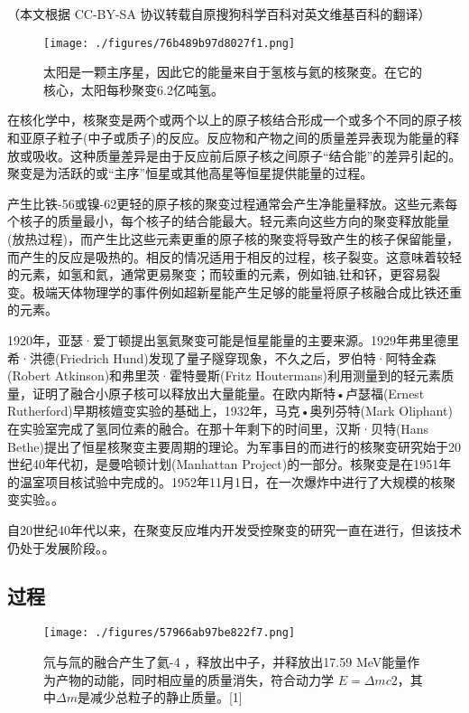 
（本文根据 CC-BY-SA 协议转载自原搜狗科学百科对英文维基百科的翻译）
\begin{figure}[ht]
\centering
\texttt{[image: ./figures/76b489b97d8027f1.png]}
\caption{太阳是一颗主序星，因此它的能量来自于氢核与氦的核聚变。在它的核心，太阳每秒聚变6.2亿吨氢。} \label{fig_HJB_13}
\end{figure}

在核化学中，核聚变是两个或两个以上的原子核结合形成一个或多个不同的原子核和亚原子粒子(中子或质子)的反应。反应物和产物之间的质量差异表现为能量的释放或吸收。这种质量差异是由于反应前后原子核之间原子“结合能”的差异引起的。聚变是为活跃的或“主序”恒星或其他高星等恒星提供能量的过程。

产生比铁-56或镍-62更轻的原子核的聚变过程通常会产生净能量释放。这些元素每个核子的质量最小，每个核子的结合能最大。轻元素向这些方向的聚变释放能量(放热过程)，而产生比这些元素更重的原子核的聚变将导致产生的核子保留能量，而产生的反应是吸热的。相反的情况适用于相反的过程，核子裂变。这意味着较轻的元素，如氢和氦，通常更易聚变；而较重的元素，例如铀,钍和钚，更容易裂变。极端天体物理学的事件例如超新星能产生足够的能量将原子核融合成比铁还重的元素。

1920年，亚瑟·爱丁顿提出氢氦聚变可能是恒星能量的主要来源。1929年弗里德里希·洪德(Friedrich Hund)发现了量子隧穿现象，不久之后，罗伯特·阿特金森(Robert Atkinson)和弗里茨·霍特曼斯(Fritz Houtermans)利用测量到的轻元素质量，证明了融合小原子核可以释放出大量能量。在欧内斯特•卢瑟福(Ernest Rutherford)早期核嬗变实验的基础上，1932年，马克•奥列芬特(Mark Oliphant)在实验室完成了氢同位素的融合。在那十年剩下的时间里，汉斯·贝特(Hans Bethe)提出了恒星核聚变主要周期的理论。为军事目的而进行的核聚变研究始于20世纪40年代初，是曼哈顿计划(Manhattan Project)的一部分。核聚变是在1951年的温室项目核试验中完成的。1952年11月1日，在一次爆炸中进行了大规模的核聚变实验。。

自20世纪40年代以来，在聚变反应堆内开发受控聚变的研究一直在进行，但该技术仍处于发展阶段。。

\subsection{过程}
\begin{figure}[ht]
\centering
\texttt{[image: ./figures/57966ab97be822f7.png]}
\caption{氘与氚的融合产生了氦-4 ，释放出中子，并释放出17.59 MeV能量作为产物的动能，同时相应量的质量消失，符合动力学 $E = \Delta mc2$，其中$\Delta m$是减少总粒子的静止质量。[1]} \label{fig_HJB_1}
\end{figure}

